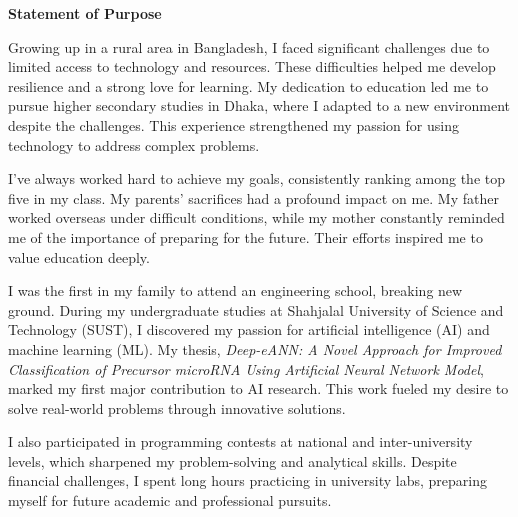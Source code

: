 \documentclass[11pt]{article}
\newif\ifshowsections
\begin{document}
\begin{center}
{\Large \textbf{Statement of Purpose}}
\end{center}


\ifshowsections\section*{Introduction}\fi


Growing up in a rural area in Bangladesh, I faced significant challenges due to limited access to technology and resources. These difficulties helped me develop resilience and a strong love for learning. My dedication to education led me to pursue higher secondary studies in Dhaka, where I adapted to a new environment despite the challenges. This experience strengthened my passion for using technology to address complex problems.


\ifshowsections\section*{Academic Journey}\fi


I’ve always worked hard to achieve my goals, consistently ranking among the top five in my class. My parents’ sacrifices had a profound impact on me. My father worked overseas under difficult conditions, while my mother constantly reminded me of the importance of preparing for the future. Their efforts inspired me to value education deeply.


I was the first in my family to attend an engineering school, breaking new ground. During my undergraduate studies at Shahjalal University of Science and Technology (SUST), I discovered my passion for artificial intelligence (AI) and machine learning (ML). My thesis, \textit{Deep-eANN: A Novel Approach for Improved Classification of Precursor microRNA Using Artificial Neural Network Model}, marked my first major contribution to AI research. This work fueled my desire to solve real-world problems through innovative solutions.


I also participated in programming contests at national and inter-university levels, which sharpened my problem-solving and analytical skills. Despite financial challenges, I spent long hours practicing in university labs, preparing myself for future academic and professional pursuits.


\ifshowsections\section*{Personal Resilience and Sacrifices}\fi
\end{document}
